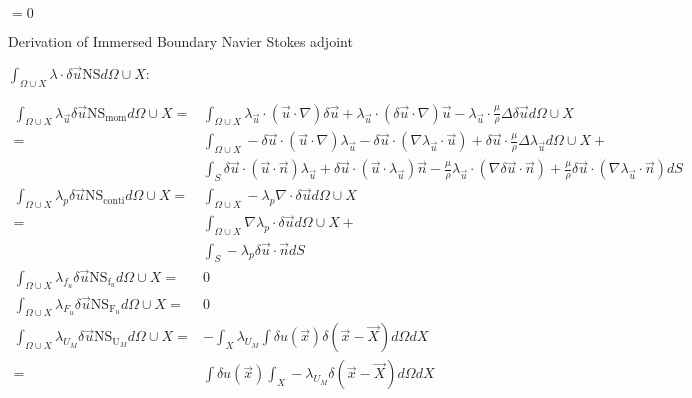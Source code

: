 \documentclass[10pt]{article} %
\begin{document}
\begin{center}
$=0$\\

\newpage
\fontsize{8}{6}
\begin{flushleft}
	Derivation of Immersed Boundary Navier Stokes adjoint
\end{flushleft}
\begin{flushleft}
	$\int_{\Omega \cup X} \lambda \cdot \delta \vec{u} \text{NS}d\Omega \cup X :$
\end{flushleft}
\begin{align*}
	\int_{\Omega \cup X} \lambda_{\vec{u}} \delta \vec{u} \text{NS}_{\text{mom}} d\Omega \cup X = &
	\int_{\Omega \cup X} \lambda_{\vec{u}} \cdot (\vec{u}\cdot\nabla) \delta{\vec{u}} + \lambda_{\vec{u}} \cdot (\delta{\vec{u}}\cdot\nabla)\vec{u}-\lambda_{\vec{u}} \cdot \frac{\mu}{\rho} \Delta \delta{\vec{u}} d\Omega \cup X\\
	=&\int_{\Omega \cup X} - \delta{\vec{u}} \cdot (\vec{u}\cdot\nabla) \lambda_{\vec{u}} - \delta \vec{u} \cdot \left(\nabla \lambda_{\vec{u}} \cdot \vec{u}\right) + \delta{\vec{u}} \cdot \frac{\mu}{\rho} \Delta \lambda_{\vec{u}} d\Omega \cup X +\\
	&\int_{S} \delta \vec{u} \cdot \left(\vec{u}\cdot \vec{n}\right) \lambda_{\vec{u}} + \delta \vec{u} \cdot \left(\vec{u}\cdot \lambda_{\vec{u}}\right)\vec{n} - \frac{\mu}{\rho} \lambda_{\vec{u}} \cdot \left(\nabla \delta \vec{u} \cdot \vec{n}\right) + \frac{\mu}{\rho} \delta \vec{u} \cdot \left(\nabla \lambda_{\vec{u}} \cdot \vec{n}\right) dS\\
	\int_{\Omega \cup X} \lambda_p \delta \vec{u} \text{NS}_{\text{conti}} d\Omega \cup X =&
	\int_{\Omega \cup X} -\lambda_p \nabla \cdot \delta\vec{u} d\Omega \cup X \\
	=&\int_{\Omega \cup X} \nabla\lambda_p  \cdot \delta\vec{u} d\Omega \cup X +\\
	&\int_{S}-\lambda_p \delta\vec{u} \cdot \vec{n} dS\\
	\int_{\Omega \cup X} \lambda_{f_u} \delta \vec{u} \text{NS}_{\text{f}_u} d\Omega \cup X =& 0\\
	\int_{\Omega \cup X} \lambda_{F_u} \delta \vec{u} \text{NS}_{\text{F}_u} d\Omega \cup X =& 0\\
	\int_{\Omega \cup X} \lambda_{U_M} \delta \vec{u} \text{NS}_{\text{U}_M} d\Omega \cup X =&  - \int_{X} \lambda_{U_M} \int \delta u(\vec{x}) \delta(\vec{x}-\vec{X}) d \Omega dX\\
	=&  \int \delta u(\vec{x}) \int_X -\lambda_{U_M} \delta(\vec{x}-\vec{X}) d \Omega dX\\

\end{align*}
\end{center}
\end{document}
